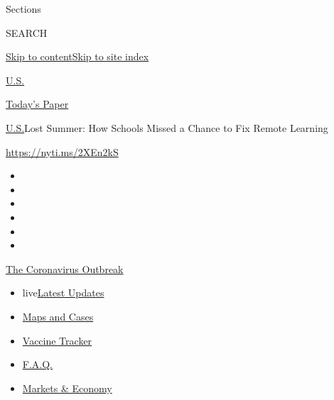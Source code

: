 Sections

SEARCH

\protect\hyperlink{site-content}{Skip to
content}\protect\hyperlink{site-index}{Skip to site index}

\href{https://www.nytimes3xbfgragh.onion/section/us}{U.S.}

\href{https://myaccount.nytimes3xbfgragh.onion/auth/login?response_type=cookie\&client_id=vi}{}

\href{https://www.nytimes3xbfgragh.onion/section/todayspaper}{Today's
Paper}

\href{/section/us}{U.S.}\textbar{}Lost Summer: How Schools Missed a
Chance to Fix Remote Learning

\url{https://nyti.ms/2XEn2kS}

\begin{itemize}
\item
\item
\item
\item
\item
\item
\end{itemize}

\href{https://www.nytimes3xbfgragh.onion/news-event/coronavirus?action=click\&pgtype=Article\&state=default\&region=TOP_BANNER\&context=storylines_menu}{The
Coronavirus Outbreak}

\begin{itemize}
\tightlist
\item
  live\href{https://www.nytimes3xbfgragh.onion/2020/08/07/world/covid-19-news.html?action=click\&pgtype=Article\&state=default\&region=TOP_BANNER\&context=storylines_menu}{Latest
  Updates}
\item
  \href{https://www.nytimes3xbfgragh.onion/interactive/2020/us/coronavirus-us-cases.html?action=click\&pgtype=Article\&state=default\&region=TOP_BANNER\&context=storylines_menu}{Maps
  and Cases}
\item
  \href{https://www.nytimes3xbfgragh.onion/interactive/2020/science/coronavirus-vaccine-tracker.html?action=click\&pgtype=Article\&state=default\&region=TOP_BANNER\&context=storylines_menu}{Vaccine
  Tracker}
\item
  \href{https://www.nytimes3xbfgragh.onion/interactive/2020/world/coronavirus-tips-advice.html?action=click\&pgtype=Article\&state=default\&region=TOP_BANNER\&context=storylines_menu}{F.A.Q.}
\item
  \href{https://www.nytimes3xbfgragh.onion/live/2020/08/07/business/stock-market-today-coronavirus?action=click\&pgtype=Article\&state=default\&region=TOP_BANNER\&context=storylines_menu}{Markets
  \& Economy}
\end{itemize}

